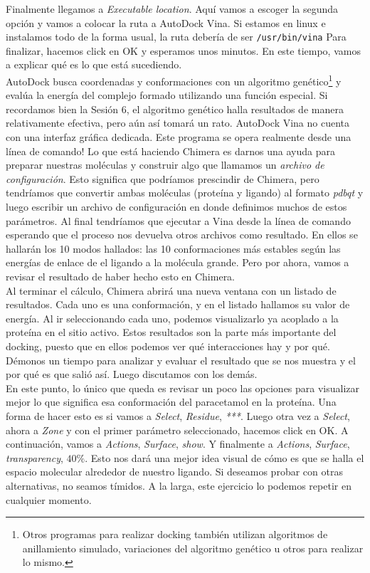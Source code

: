 \documentclass[10pt,letterpaper]{article}
\newcommand{\inlinecode}[1]{
\colorbox{light-gray}{\texttt{#1}}
}
\begin{document}
Finalmente llegamos a \emph{Executable location}. Aqu\'i vamos a escoger la segunda opci\'on y vamos a colocar la ruta a AutoDock Vina. Si estamos en linux e instalamos todo de la forma usual, la ruta deber\'ia de ser \inlinecode{/usr/bin/vina} Para finalizar, hacemos click en OK y esperamos unos minutos. En este tiempo, vamos a explicar qu\'e es lo que est\'a sucediendo.\\

AutoDock busca coordenadas y conformaciones con un algoritmo gen\'etico\footnote{Otros programas para realizar docking tambi\'en utilizan algoritmos de anillamiento simulado, variaciones del algoritmo gen\'etico u otros para realizar lo mismo.} y eval\'ua la energ\'ia del complejo formado utilizando una funci\'on especial. Si recordamos bien la Sesi\'on 6, el algoritmo gen\'etico halla resultados de manera relativamente efectiva, pero a\'un as\'i tomar\'a un rato. AutoDock Vina no cuenta con una interfaz gr\'afica dedicada. Este programa se opera realmente desde una l\'inea de comando! Lo que est\'a haciendo Chimera es darnos una ayuda para preparar nuestras mol\'eculas y construir algo que llamamos un \emph{archivo de configuraci\'on}. Esto significa que podr\'iamos prescindir de Chimera, pero tendr\'iamos que convertir ambas mol\'eculas (prote\'ina y ligando) al formato \emph{pdbqt} y luego escribir un archivo de configuraci\'on en donde definimos muchos de estos par\'ametros. Al final tendr\'iamos que ejecutar a Vina desde la l\'inea de comando esperando que el proceso nos devuelva otros archivos como resultado. En ellos se hallar\'an los 10 modos hallados: las 10 conformaciones m\'as estables seg\'un las energ\'ias de enlace de el ligando a la mol\'ecula grande. Pero por ahora, vamos a revisar el resultado de haber hecho esto en Chimera.\\

Al terminar el c\'alculo, Chimera abrir\'a una nueva ventana con un listado de resultados. Cada uno es una conformaci\'on, y en el listado hallamos su valor de energ\'ia. Al ir seleccionando cada uno, podemos visualizarlo ya acoplado a la prote\'ina en el sitio activo. Estos resultados son la parte m\'as importante del docking, puesto que en ellos podemos ver qu\'e interacciones hay y por qu\'e. D\'emonos un tiempo para analizar y evaluar el resultado que se nos muestra y el por qu\'e es que sali\'o as\'i. Luego discutamos con los dem\'as.\\

En este punto, lo \'unico que queda es revisar un poco las opciones para visualizar mejor lo que significa esa conformaci\'on del paracetamol en la prote\'ina. Una forma de hacer esto es si vamos a \emph{Select}, \emph{Residue}, \emph{***}. Luego otra vez a \emph{Select}, ahora a \emph{Zone} y con el primer par\'ametro seleccionado, hacemos click en OK. A continuaci\'on, vamos a \emph{Actions}, \emph{Surface}, \emph{show}. Y finalmente a \emph{Actions}, \emph{Surface}, \emph{transparency}, $40\%$. Esto nos dar\'a una mejor idea visual de c\'omo es que se halla el espacio molecular alrededor de nuestro ligando. Si deseamos probar con otras alternativas, no seamos t\'imidos. A la larga, este ejercicio lo podemos repetir en cualquier momento.\\
\end{document}

